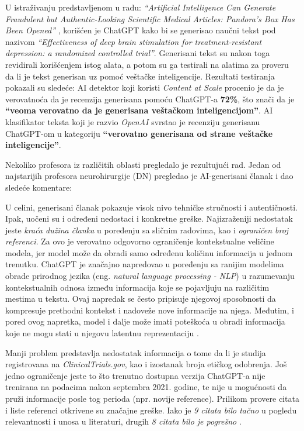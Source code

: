 \documentclass[a4paper,12pt]{article}
\begin{document}
U istraživanju predstavljenom u radu: \textit{"`Artificial Intelligence Can Generate Fraudulent but Authentic-Looking Scientific Medical Articles: Pandora’s Box Has Been Opened"'} \cite{doi/10.2196/46924}, korišćen je ChatGPT kako bi se generisao naučni tekst pod nazivom \textit{"`Effectiveness of deep brain stimulation for treatment-resistant depression: a randomized controlled trial"'}.  
Generisani tekst su nakon toga revidirali korišćenjem istog alata, a potom su ga testirali na alatima za proveru da li je tekst generisan uz pomoć veštačke inteligencije.  
Rezultati testiranja pokazali su sledeće: AI detektor koji koristi \textit{Content at Scale} procenio je da je verovatnoća da je recenzija generisana pomoću ChatGPT-a \textbf{72\%}, što znači da je \textbf{"`veoma verovatno da je generisana veštačkom inteligencijom"'}. AI klasifikator teksta koji je razvio \textit{OpenAI} svrstao je recenziju generisanu ChatGPT-om u kategoriju \textbf{"`verovatno generisana od strane veštačke inteligencije"'}.

Nekoliko profesora iz različitih oblasti pregledalo je rezultujući rad.  
Jedan od najstarijih profesora neurohirurgije (DN) pregledao je AI-generisani članak i dao sledeće komentare: \cite{doi/10.2196/46924}

U celini, generisani članak pokazuje visok nivo tehničke stručnosti i autentičnosti. Ipak, uočeni su i određeni nedostaci i konkretne greške. Najizraženiji nedostatak jeste \textit{kraća dužina članka} u poređenju sa sličnim radovima, kao i \textit{ograničen broj referenci}. Za ovo je verovatno odgovorno ograničenje kontekstualne veličine modela, jer model može da obradi samo određenu količinu informacija u jednom trenutku.  
ChatGPT je značajno napredovao u poređenju sa ranijim modelima obrade prirodnog jezika (eng. \textit{natural language processing - NLP}) u razumevanju kontekstualnih odnosa između informacija koje se pojavljuju na različitim mestima u tekstu. Ovaj napredak se često pripisuje njegovoj sposobnosti da kompresuje prethodni kontekst i nadoveže nove informacije na njega. Međutim, i pored ovog napretka, model i dalje može imati poteškoća u obradi informacija koje ne mogu stati u njegovu latentnu reprezentaciju \cite{doi/10.2196/46924}.

Manji problem predstavlja nedostatak informacija o tome da li je studija registrovana na \textit{ClinicalTrials.gov}, kao i izostanak broja etičkog odobrenja. Još jedno ograničenje jeste to što trenutno dostupna verzija ChatGPT-a nije trenirana na podacima nakon septembra 2021. godine, te nije u mogućnosti da pruži informacije posle tog perioda (npr. novije reference). Prilikom provere citata i liste referenci otkrivene su značajne greške. Iako je \textit{9 citata bilo tačno} u pogledu relevantnosti i unosa u literaturi, drugih \textit{8 citata bilo je pogrešno} \cite{doi/10.2196/46924}. 
\end{document}
